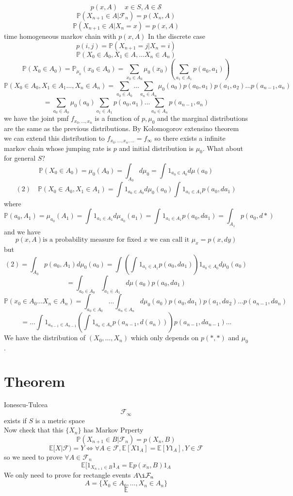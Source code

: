 \documentclass[11pt]{article}
\begin{document}
\[
    p(x, A) \quad x \in S, A \in \mathcal{S}
\] 
\[
    \mathbb{P}(X_{n+1} \in A | \mathcal{F}_n) = p(X_n, A)
\] 
\[
    \mathbb{P}(X_{n+1} \in A | X_n = x) = p(x,A)
\] 
time homogeneous markov chain with $p(x, A)$
In the discrete case
 \[
     p(i,j) = \mathbb{P}(X_{n+1} = j | X_n = i)
\] 
\[
\mathbb{P}(X_0 \in A_0, X_1 \in A, \dots X_n \in A_n)
\] 
\[
    \mathbb{P}(X_0 \in A_0) = \mathbb{P}_{\mu_0}(x_0 \in A_0) = \sum_{x_0 \in A_0}^{} \mu_0(x_0) ( \sum_{a_1 \in A_1}^{}p(a_0,a_1))
\] 
\[
    \mathbb{P}(X_0 \in A_0, X_1 \in A_1 \dots, X_n \in A_n) = \sum_{a_0 \in A_0}^{} \dots \sum_{a_n \in A_n}^{}\mu_0(a_0) p(a_0,a_1)p(a_1,a_2)\dots p(a_{n-1},a_n)
\] 
\[
    = \sum_{a_0 \in A_0}^{}\mu_0(a_0) \sum_{a_1 \in A_1}^{}p(a_0,a_1)\dots \sum_{a_n \in A_n}^{}p(a_{n-1},a_n) 
\] 
we have the joint pmf $f_{x_0,\dots,x_n}$ is a function of $p, \mu_0$ and the marginal distributions are the same as the previous distributions.
By Kolomogorov extensino theorem we can extend this distribution to $f_{x_0,\dots,x_n,\dots} = f_{\infty}$
so there exists a infinite markov chain whose jumping rate is $p$ and initial distribution is $\mu_0$.
What about for general $S$?
 \[
\mathbb{P}(X_0 \in A_0) = \mu_0(A_0) = \int_{A_0}^{}d \mu_0 = \int_{}^{}1_{a_0 \in A_0} d\mu(a_0)
\] 
\[
    (2) \quad    \mathbb{P}(X_0 \in A_0, X_1 \in A_1) = \int_{}^{}1_{a_0 \in A_0}d \mu_0(a_0) \int_{}^{}1_{a_1 \in A_1} p(a_0,da_1)
\] 
where 
\[
    \mathbb{P}(a_0, A_1)  = \mu_{a_0}(A_1) = \int_{}^{}1_{a_1 \in A_1}d\mu_{a_0}(a_1) = \int_{}^{}1_{a_1 \in A_1} p(a_0,da_1) = \int_{A_1}^{}p(a_0,d*)
\] 
and we have
\[
    p(x,A) \text{is a probability measure for fixed $x$ we can call it $\mu_x = p(x,dy)$}
\] 
but
\[
    (2) = \int_{A_0}^{}p(a_0,A_1) d \mu_0(a_0) = \int_{}^{}\left( \int_{}^{}1_{a_1 \in A_1} p(a_0,da_1)\right) 1_{a_0 \in A_0} d \mu_0(a_0)
\] 
\[
= \int_{a_0 \in A_0}^{}\int_{a_1 \in A_1}^{}d\mu(a_0) p(a_0,da_1)
\] 
\[
    \mathbb{P}(x_0 \in A_0 \dots X_n \in A_n) = \int_{a_0 \in A_0}^{} \dots \int_{a_n \in A_n}^{}d\mu_0(a_0) p(a_0,da_1)p(a_1,da_2)\dots p(a_{n-1},da_n)
\] 
\[
    = \dots \int_{}^{}1_{a_{n-1} \in A_{n-1}}\left(\int_{}^{}1_{a_n \in A_n}p(a_{n-1},d(a_n))\right)p(a_{n-1},da_{n-1}) \dots
\] 
We have the distribution of $(X_0,\dots,X_n)$ which only depends on $p(*,*)$ and  $\mu_0$.
\section{Theorem} Ionescu-Tulcea
\[
    \mathcal{F}_{\infty}
\] 
exists if $S$ is a metric space\\
Now check that this  $\{X_n\}$ has  Markov Prperty
 \[
     \mathbb{P}(X_{n+1} \in B |  \mathcal{F}_n) = p(X_n, B)
\] 
\[
    \mathbb{E}[X | \mathcal{F}) = Y \iff \forall A \in \mathcal{F}, \mathbb{E}[X 1_A] = \mathbb{E}[Y 1_A], Y \in \mathcal{F}
\] 
so we need to prove $\forall A \in \mathcal{F}_n$
\[
    \mathbb{E}[1_{X_{n+1} \in B} 1_A = \mathbb{E}p(x_n, B) 1_{A}
\] 
We only need to prove for rectangle events $A \i \mathcal{F}_n$ 
\[
    A = \{X_0 \in A_0,\dots,X_n \in A_n\}
\] 
\[
\mathbb{E} 
\] 
\end{document}
